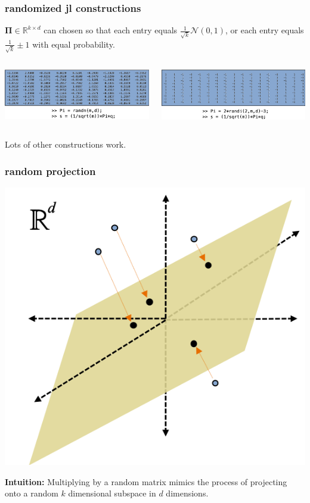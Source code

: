 \documentclass[compress]{beamer}
\newcommand{\bs}[1]{\boldsymbol{#1}}
\newcommand{\R}{\mathbb{R}}
\begin{document}
\begin{frame}
	\frametitle{randomized jl constructions}
	\begin{center}
	 $\bs{\Pi} \in \R^{k\times d}$ can chosen so that each entry equals $\frac{1}{\sqrt{k}}  \mathcal{N}(0,1)$, or each entry equals $\frac{1}{\sqrt{k}}  \pm 1$ with equal probability. 
	\end{center}
	\vspace{1em}
	
	\begin{columns}
		\begin{column}{0.5\textwidth}
			\includegraphics[width=\textwidth]{rand_gauss.png}
		\end{column}
		\begin{column}{0.5\textwidth}
			\includegraphics[width=\textwidth]{rand_sign.png}
		\end{column}
	\end{columns}
	
	\begin{center}
		Lots of other constructions work.
	\end{center}
\end{frame}

\begin{frame}
	\frametitle{random projection}
	\begin{center}
		\includegraphics[width=.6\textwidth]{random_projection.png}
	\end{center}
	\textbf{Intuition:} Multiplying by a random matrix mimics the process of projecting onto a random $k$ dimensional subspace in $d$ dimensions.
\end{frame}
\end{document}
